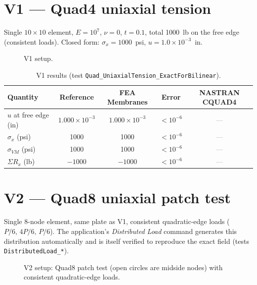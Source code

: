 \documentclass[11pt,a4paper]{report}
\newcommand{\wall}[3]{%
  \draw[thick] (#1,#2) -- (#1,#3);
  \fill[pattern=north east lines] (#1-0.18,#2) rectangle (#1,#3);
}
\newcommand{\nast}{\textcolor{gray}{---}} %
\begin{document}
\section{V1 --- Quad4 uniaxial tension}
Single $10\times10$ element, $E=10^7$, $\nu=0$, $t=0.1$, total 1000~lb on the
free edge (consistent loads). Closed form: $\sigma_x = 1000$~psi,
$u = 1.0\times10^{-3}$~in.

\begin{figure}[H]\centering
{}
\caption{V1 setup.}
\end{figure}

\begin{table}[H]\centering\small
\begin{tabular}{@{}lcccc@{}}
\toprule
Quantity & Reference & FEA Membranes & Error & NASTRAN CQUAD4 \\
\midrule
$u$ at free edge (in) & $1.000\times10^{-3}$ & $1.000\times10^{-3}$ & $<10^{-6}$ & \nast \\
$\sigma_x$ (psi) & 1000 & 1000 & $<10^{-6}$ & \nast \\
$\sigma_{VM}$ (psi) & 1000 & 1000 & $<10^{-6}$ & \nast \\
$\Sigma R_x$ (lb) & $-1000$ & $-1000$ & $<10^{-6}$ & \nast \\
\bottomrule
\end{tabular}
\caption{V1 results (test \texttt{Quad\_UniaxialTension\_ExactForBilinear}).}
\end{table}

\section{V2 --- Quad8 uniaxial patch test}
Single 8-node element, same plate as V1, consistent quadratic-edge loads
($P/6,\,4P/6,\,P/6$). The application's \emph{Distributed Load} command
generates this distribution automatically and is itself verified to reproduce
the exact field (tests \texttt{DistributedLoad\_*}).

\begin{figure}[H]\centering
{}
\caption{V2 setup: Quad8 patch test (open circles are midside nodes) with
consistent quadratic-edge loads.}
\end{figure}
\end{document}
